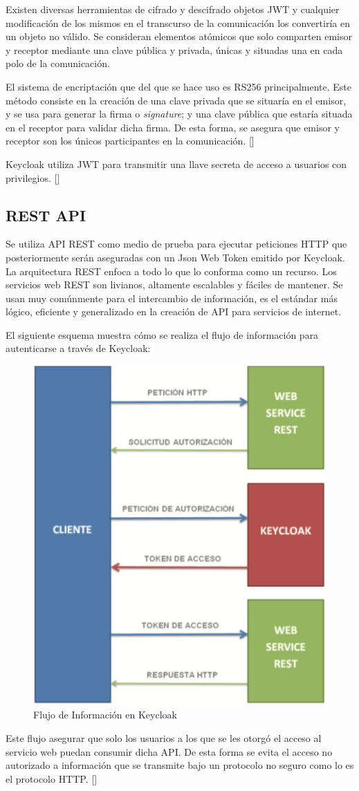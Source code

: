 Existen diversas herramientas de cifrado y descifrado objetos JWT y cualquier modificación de los mismos en el transcurso de la comunicación los convertiría en un objeto no válido. Se consideran elementos atómicos que solo comparten emisor y receptor mediante una clave pública y privada, únicas y situadas una en cada polo de la comunicación. 

El sistema de encriptación que del que se hace uso es RS256 principalmente. Este método consiste en la creación de una clave privada que se situaría en el emisor, y se usa para generar la firma o \textit{signature}; y una clave pública que estaría situada en el receptor para validar dicha firma. De esta forma, se asegura que emisor y receptor son los únicos participantes en la comunicación. [\cite{lobato2022regulacion}]

 Keycloak utiliza JWT para transmitir una llave secreta de acceso a usuarios con privilegios. [\cite{muyon2020metodos}]


\subsection{REST API}
Se utiliza API REST como medio de prueba para ejecutar peticiones HTTP que posteriormente serán aseguradas con un Json Web Token emitido por Keycloak. La arquitectura REST enfoca a todo lo que lo conforma como un recurso. Los servicios web REST son livianos, altamente escalables y fáciles de mantener. Se usan muy comúnmente para el intercambio de información, es el estándar más lógico, eficiente y generalizado en la creación de API para servicios de internet.

El siguiente esquema muestra cómo se realiza el flujo de información para autenticarse a través de Keycloak:

\begin{figure}[H]
	\centering
	\includegraphics[width=0.7\linewidth]{Graphics/keycloak_info_flux}
	\caption{Flujo de Información en Keycloak}
	\label{fig:Flujo de Información en Keycloak}
\end{figure}

Este flujo asegurar que solo los usuarios a los que se les otorgó el acceso al servicio web puedan consumir dicha API. De esta forma se evita el acceso no autorizado a información que se transmite bajo un protocolo no seguro como lo es el protocolo HTTP. [\cite{muyon2020metodos}]

